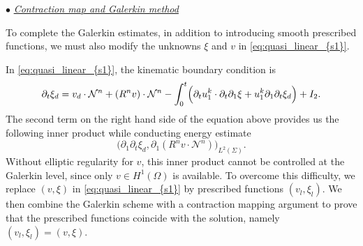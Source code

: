 \documentclass[letterpaper,reqno,10pt,twoside]{amsart}
\theoremstyle{definition}
\theoremstyle{remark}
\begin{document}
	\noindent $\bullet$ \underline{\textsl{Contraction map and Galerkin method}}
	
	To complete the Galerkin estimates, in addition to introducing smooth prescribed functions, we must also modify the unknowns $\xi$ and $v$ in \eqref{eq:quasi_linear_{s1}}.
	
	In \eqref{eq:quasi_linear_{s1}}, the kinematic boundary condition is 
	\[
	\partial_{t}\xi_{d}
	=v_{d}\cdot \mathcal{N}^{n}
	+(R^{n}v)\cdot \mathcal{N}^{n}
	-\int_{0}^{t}\Bigl(
	\partial_{t}u_{1}^{k}\cdot\partial_{t}\partial_{1}\xi
	+u_{1}^{k}\partial_{1}\partial_{t}\xi_{d}
	\Bigr)
	+I_{2}.
	\]
	The second term on the right hand side of the equation above provides us the following inner product while conducting energy estimate
	\[
	\bigl(\partial_{1}\partial_{t}\xi_{d},
	\partial_{1}(R^{n}v\cdot\mathcal{N}^{n})\bigr)_{L^{2}(\Sigma)}.
	\]
	Without elliptic regularity for $v$, this inner product cannot be controlled at the Galerkin level, since only $v\in H^{1}(\Omega)$ is available. To overcome this difficulty, we replace $(v,\xi)$ in \eqref{eq:quasi_linear_{s1}} by prescribed functions $(v_{l},\xi_{l})$. We then combine the Galerkin scheme with a contraction mapping argument to prove that the prescribed functions coincide with the solution, namely $(v_{l},\xi_{l})=(v,\xi)$.
	
\end{document}

